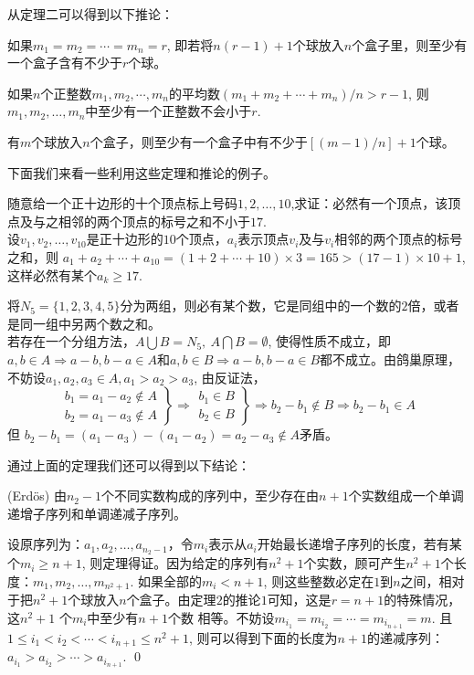 从定理二可以得到以下推论：
\begin{prop}
如果$m_1=m_2=\cdots=m_n=r$,
即若将$n(r-1)+1$个球放入$n$个盒子里，则至少有一个盒子含有不少于$r$个球。
\end{prop}
\begin{prop}
如果$n$个正整数$m_1,m_2,\cdots,m_n$的平均数$(m_1+m_2+\cdots+m_n)/n>r-1$,
则$m_1,m_2,\ldots,m_n$中至少有一个正整数不会小于$r$.
\end{prop}
\begin{prop}
有$m$个球放入$n$个盒子，则至少有一个盒子中有不少于$[(m-1)/n]+1$个球。
\end{prop}

下面我们来看一些利用这些定理和推论的例子。
\begin{exa}
随意给一个正十边形的十个顶点标上号码$1,2,\ldots,10$,求证：必然有一个顶点，该顶点及与之相邻的两个顶点的标号之和不小于$17$.
\\ \pf 设$v_1,v_2,\ldots,v_{10}$是正十边形的$10$个顶点，$a_i$表示顶点$v_i$及与$v_i$相邻的两个顶点的标号之和，则
$a_1+a_2+\cdots+a_{10}=(1+2+\cdots+10)\times 3=165>(17-1)\times
10+1$, 这样必然有某个$a_k\geq 17$.
\end{exa}

\begin{exa}
将$N_5=\{1,2,3,4,5\}$分为两组，则必有某个数，它是同组中的一个数的$2$倍，或者是同一组中另两个数之和。\\
\pf 若存在一个分组方法，$A\bigcup B=N_5,\ A\bigcap B=\emptyset $,
使得性质不成立，即$a,b\in A \Rightarrow a-b,b-a\in A$和$a,b\in B
\Rightarrow a-b,b-a \in
B$都不成立。由鸽巢原理，不妨设$a_1,a_2,a_3\in A, a_1>a_2>a_3$,
由反证法，
$$\left.\begin{array}{c}
  b_1 = a_1-a_2\notin A \\
  b_2 = a_1-a_3\notin A
\end{array}\right\}\Rightarrow\left. \begin{array}{c}
                                  b_1\in B \\
                                    b_2 \in B
                                \end{array}\right\}\Rightarrow
   b_2-b_1 \notin B \Rightarrow b_2-b_1\in A$$
但 $b_2-b_1=(a_1-a_3)-(a_1-a_2)=a_2-a_3\notin A$矛盾。
\end{exa}

通过上面的定理我们还可以得到以下结论：
\begin{thm}{(Erd\"{o}s)}
由$n_2-1$个不同实数构成的序列中，至少存在由$n+1$个实数组成一个单调递增子序列和单调递减子序列。
\end{thm}
\pf
设原序列为：$a_1,a_2,\ldots,a_{n_2-1}$，令$m_i$表示从$a_i$开始最长递增子序列的长度，若有某个$m_i\geq
n+1$,
则定理得证。因为给定的序列有$n^2+1$个实数，顾可产生$n^2+1$个长度：$m_1,m_2,\ldots,m_{n^2+1}$.
如果全部的$m_i<n+1$,
则这些整数必定在$1$到$n$之间，相对于把$n^2+1$个球放入$n$个盒子。由定理$2$的推论$1$可知，这是$r=n+1$的特殊情况，这$n^2+1$
个$m_i$中至少有$n+1$个数
相等。不妨设$m_{i_1}=m_{i_2}=\cdots=m_{i_{n+1}}=m$. 且$1\leq
i_1<i_2<\cdots<i_{n+1}\leq n^2+1$,
则可以得到下面的长度为$n+1$的递减序列：$a_{i_1}>a_{i_2}>\cdots>a_{i_{n+1}}$.
\qed

